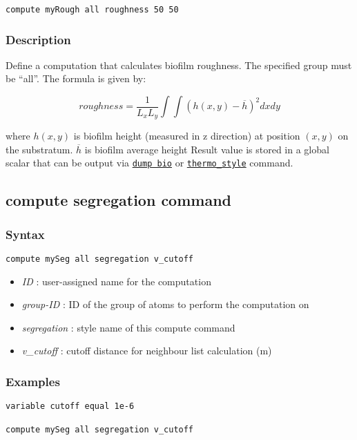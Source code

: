 \documentclass[11pt,a4paper,openright]{article}
\begin{document}
\begin{Verbatim}[frame=single]
compute myRough all roughness 50 50	
\end{Verbatim}

\subsubsection*{Description}

Define a computation that calculates biofilm roughness. 
The specified group must be  ``all''.
The formula is given by:

\[ roughness = \frac{1}{L_xL_y} \int\int (h(x,y) - \overline{h})^2 dxdy \]

where $h(x,y)$ is biofilm height (measured in z direction) at 
position $(x, y)$ on the substratum.  $\overline{h}$ is biofilm average height
Result value is stored in 
a global scalar that can be output via \hyperref[dumpbio]{\tt dump bio}
or \href{http://lammps.sandia.gov/doc/thermo_style.html}{\tt thermo\_style} command.


\newpage
\subsection{compute segregation command}
\label{csegregation}

\subsubsection*{Syntax}
\begin{Verbatim}[frame=single]
compute mySeg all segregation v_cutoff	
\end{Verbatim}

\begin{itemize}  [nosep]
\item
	{\it ID }: user-assigned name for the computation
\item
	{\it group-ID }: ID of the group of atoms to perform the computation on
\item
	{\it segregation }: style name of this compute command
\item
	{\it v\_cutoff }: cutoff distance for neighbour list calculation (m)
\end{itemize}

\subsubsection*{Examples}

\begin{Verbatim}[frame=single]
variable cutoff equal 1e-6

compute mySeg all segregation v_cutoff	
\end{Verbatim}
\end{document}
